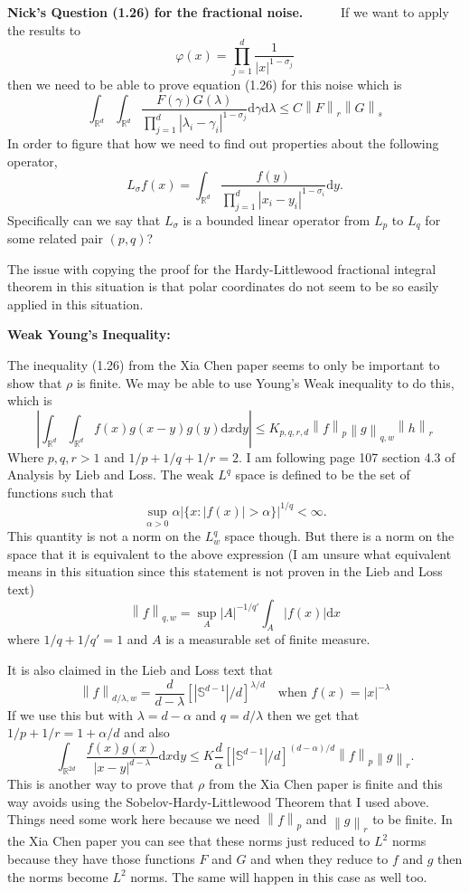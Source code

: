 \documentclass[a4paper,11pt]{article}
\numberwithin{equation}{section}
\theoremstyle{plain}
\theoremstyle{definition}
\newcommand{\ud}{\ensuremath{\mathrm{d} }}
\newcommand{\Norm}[1]{\left\|  #1   \right\|}
\newcommand{\R}{\mathbb{R}}
\newcounter{NQ}
\newenvironment{NickQuestion}[1][] %
{\refstepcounter{NQ}
	\begin{mdframed}[backgroundcolor=lightgray]\textbf{Nick's Question \theNQ \: #1~~}~~~\noindent}%
	{\end{mdframed}}
\numberwithin{NQ}{section}
\numberwithin{LQ}{section}
\numberwithin{ZQ}{section}
\begin{document}
	\begin{NickQuestion}[(1.26) for the fractional noise.]
		If we want to apply the results to
		\[
		\varphi(x) = \prod_{j = 1}^d \frac{1}{|x|^{1-\sigma_j}}
		\]
		then we need to be able to prove equation (1.26) for this noise which is
		\[
		\int_{\R^d}\int_{\R^d} \frac{F(\gamma)G(\lambda)}{ \prod_{j = 1}^d |\lambda_i - \gamma_i|^{1-\sigma_j}} \ud \gamma \ud \lambda \le C\Norm{F}_r \Norm{G}_s
		\]
		In order to figure that how we need to find out properties about the following operator,
		\[
		L_\sigma f (x) = \int_{\R^d} \frac{f(y)}{\prod_{j = 1}^d |x_i - y_i|^{1-\sigma_i} } \ud y.
		\]
		Specifically can we say that $L_\sigma$ is a bounded linear operator from $L_p$ to $L_q$ for some related pair $(p,q)$?

		The issue with copying the proof for the Hardy-Littlewood fractional integral theorem in this situation is that polar coordinates do not seem to be so easily applied in this situation.

		\noindent \textbf{Weak Young's Inequality:}

		The inequality (1.26) from the Xia Chen paper seems to only be important to show that $\rho$ is finite. We may be able to use Young's Weak inequality to do this, which is
		\[
		\left|	\int_{\R^d}\int_{\R^d}f(x)g(x-y)g(y) \ud x \ud y \right| \le K_{p,q,r,d} \Norm{f}_p\Norm{g}_{q,w}\Norm{h}_r
		\]
		Where $p,q,r >1$ and $1/p + 1/q + 1/r =2$. I am following page 107 section 4.3 of Analysis by Lieb and Loss. The weak $L^q$ space is defined to be the set of functions such that
		\[
		\sup_{\alpha >0} \alpha \left| \{ x: |f(x)| > \alpha \} \right|^{1/q} < \infty.
		\]
		This quantity is not a norm on the $L^q_w$ space though. But there is a norm on the space that it is equivalent to the above expression (I am unsure what equivalent means in this situation since this statement is not proven in the Lieb and Loss text)
		\[
		\Norm{f}_{q,w} =  \sup_{A} |A|^{-1/{q'}} \int_A |f(x)| \ud x
		\]
		where $1/q + 1/q' = 1$ and $A$ is a measurable set of finite measure.

		It is also claimed in the Lieb and Loss text that
		\[
		\Norm{f}_{{d/\lambda},w} = \frac{d}{d-\lambda}\left[ |\mathbb{S}^{d-1}|/d \right]^{\lambda/d} \quad \text{when } f(x) = |x|^{-\lambda}
		\]
		If we use this but with $\lambda = d - \alpha$ and $q=d/ \lambda$ then we get that $1/p + 1/r =1 + \alpha / d$ and also
		\[
		\int_{\R^{2d}} \frac{f(x)g(x)}{|x-y|^{d-\lambda}} \ud x \ud y \le K  \frac{d}{\alpha}\left[ |\mathbb{S}^{d-1}|/d \right]^{(d-\alpha)/d}  \Norm{f}_p\Norm{g}_r.
		\]
		This is another way to prove that $\rho$ from the Xia Chen paper is finite and this way avoids using the Sobelov-Hardy-Littlewood Theorem that I used above. Things  need some work here because we need $\Norm{f}_p$ and $\Norm{g}_r$ to be finite. In the Xia Chen paper you can see that these norms just reduced to $L^2$ norms because they have those functions $F$ and $G$ and when they reduce to $f$ and $g$ then the norms become $L^2$ norms. The same will happen in this case as well too.


\end{NickQuestion}
\end{document}
